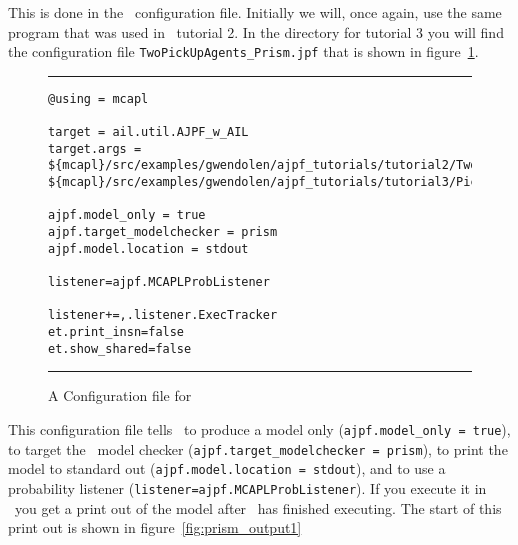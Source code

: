 This is done in the \ajpf\ configuration file.  Initially we will, once again, use the same program that was used in \ajpf\ tutorial 2.  In the directory for tutorial 3 you will find the configuration file \texttt{TwoPickUpAgents\_Prism.jpf} that is shown in figure~\ref{fig:prism_config1}.

\begin{figure}[htb]
\noindent\rule{\textwidth}{1pt}
\begin{small}
\begin{verbatim}
@using = mcapl

target = ail.util.AJPF_w_AIL
target.args = ${mcapl}/src/examples/gwendolen/ajpf_tutorials/tutorial2/TwoPickUpAgents.ail,
${mcapl}/src/examples/gwendolen/ajpf_tutorials/tutorial3/PickUpAgent.psl,1

ajpf.model_only = true
ajpf.target_modelchecker = prism
ajpf.model.location = stdout

listener=ajpf.MCAPLProbListener

listener+=,.listener.ExecTracker
et.print_insn=false
et.show_shared=false
\end{verbatim}
\end{small}
\rule{\textwidth}{1pt}
\caption{A Configuration file for \prism}
\label{fig:prism_config1}
\end{figure}

This configuration file tells \ajpf\ to produce a model only (\texttt{ajpf.model\_only = true}), to target the \prism\ model checker (\texttt{ajpf.target\_modelchecker = prism}), to print the model to standard out (\texttt{ajpf.model.location = stdout}), and to use a probability listener (\texttt{listener=ajpf.MCAPLProbListener}).  If you execute it in \ajpf\ you get a print out of the model after \ajpf\  has finished executing.  The start of this print out is shown in figure~\ref{fig:prism_output1}

